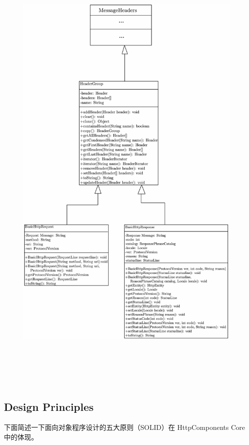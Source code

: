 \documentclass{article}
\begin{document}
	\begin{figure}[H]
		\centering
		\includegraphics[height = 23cm, width = 17cm]{pics/31_Classes_UML.JPG}	
	\end{figure}

	\clearpage
	\subsection{Design Principles}
	\begin{CJK}{UTF8}{gbsn}
		\noindent 下面简述一下面向对象程序设计的五大原则（SOLID）在 HttpComponents Core 中的体现。
	\end{CJK}{}
\end{document}
